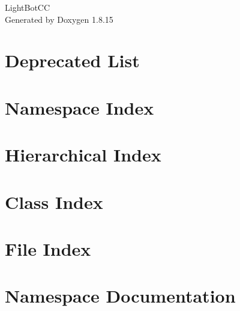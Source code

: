 \documentclass[twoside]{book}
\newcommand{\+}{\discretionary{\mbox{\scriptsize$\hookleftarrow$}}{}{}}
\newcommand{\clearemptydoublepage}{%
  \newpage{\pagestyle{empty}\cleardoublepage}%
}
\begin{document}
\hypersetup{pageanchor=false,
             bookmarksnumbered=true,
             pdfencoding=unicode
            }
\begin{titlepage}
\vspace*{7cm}
\begin{center}%
{\Large Light\+Bot\+CC }\\
\vspace*{1cm}
{\large Generated by Doxygen 1.8.15}\\
\end{center}
\end{titlepage}
\clearemptydoublepage
{}
\tableofcontents
\clearemptydoublepage
{}
\hypersetup{pageanchor=true}

\chapter{Deprecated List}
\label{deprecated}

\chapter{Namespace Index}

\chapter{Hierarchical Index}

\chapter{Class Index}

\chapter{File Index}

\chapter{Namespace Documentation}







\end{document}
